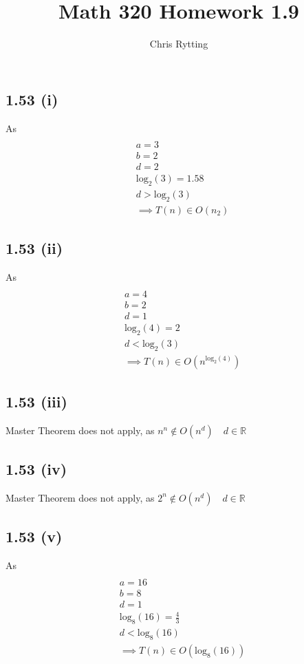 \documentclass[letterpaper,12pt]{article}
\theoremstyle{definition}
\begin{document}
\title{Math 320 Homework 1.9}
\author{Chris Rytting}
\maketitle
\subsection*{1.53 (i)}
As 
\begin{align*}
\\&a=3\\
&b=2\\
&d=2\\
&\text{log}_2 (3) = 1.58\\
&d > \text{log}_2 (3)\\
&\implies T(n) \in O(n_2)    
\end{align*}

\subsection*{1.53 (ii)}
As 
\begin{align*}
\\&a=4\\
&b=2\\
&d=1\\
&\text{log}_2 (4) = 2\\
&d < \text{log}_2 (3)\\
&\implies T(n) \in O(n^{\text{log}_2 (4)})    
\end{align*}

\subsection*{1.53 (iii)}
Master Theorem does not apply, as $n^n \not\in O(n^d) \quad d \in \mathbb{R} $

\subsection*{1.53 (iv)}
Master Theorem does not apply, as $2^n \not\in O(n^d) \quad d \in \mathbb{R} $

\subsection*{1.53 (v)}
As 
\begin{align*}
\\&a=16\\
&b=8\\
&d=1\\
&\text{log}_8 (16) = \frac{4}{3}\\
&d < \text{log}_8 (16)\\
&\implies T(n) \in O(\text{log}_8 (16) )    
\end{align*}
\end{document}
